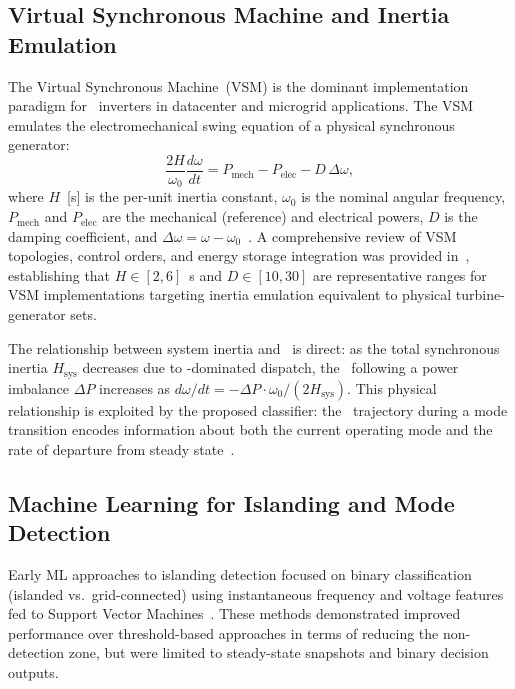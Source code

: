 \documentclass[journal]{IEEEtran}
\newcommand{\rocof}{\text{RoCoF}}
\newcommand{\gfl}{\text{GFL}}
\newcommand{\gfm}{\text{GFM}}
\begin{document}
\subsection{Virtual Synchronous Machine and Inertia Emulation}

The Virtual Synchronous Machine~(VSM) is the dominant implementation
paradigm for \gfm\ inverters in datacenter and microgrid applications.
The VSM emulates the electromechanical swing equation of a physical
synchronous generator:
%
\begin{equation}
  \frac{2H}{\omega_0}\frac{d\omega}{dt}
  = P_\text{mech} - P_\text{elec} - D\,\Delta\omega,
  \label{eq:swing}
\end{equation}
%
where $H$~[s] is the per-unit inertia constant, $\omega_0$ is the
nominal angular frequency, $P_\text{mech}$ and $P_\text{elec}$ are
the mechanical (reference) and electrical powers, $D$ is the damping
coefficient, and $\Delta\omega = \omega - \omega_0$~\cite{b_vsm_review}.
A comprehensive review of VSM topologies, control orders, and energy
storage integration was provided in~\cite{b_vsm_review},
establishing that $H \in [2, 6]$~s and $D \in [10, 30]$ are representative
ranges for VSM implementations targeting inertia emulation equivalent
to physical turbine-generator sets.

The relationship between system inertia and \rocof\ is direct:
as the total synchronous inertia $H_\text{sys}$ decreases due to
\gfl-dominated dispatch, the \rocof\ following a power imbalance
$\Delta P$ increases as $d\omega/dt = -\Delta P \cdot \omega_0 / (2 H_\text{sys})$.
This physical relationship is exploited by the proposed classifier:
the \rocof\ trajectory during a mode transition encodes information
about both the current operating mode and the rate of departure from
steady state~\cite{b_vinertia_review}.

\subsection{Machine Learning for Islanding and Mode Detection}

Early ML approaches to islanding detection focused on binary
classification (islanded vs.\ grid-connected) using instantaneous
frequency and voltage features fed to Support Vector
Machines~\cite{b_svm_islanding}.
These methods demonstrated improved performance over threshold-based
approaches in terms of reducing the non-detection zone, but were
limited to steady-state snapshots and binary decision outputs.
\end{document}
